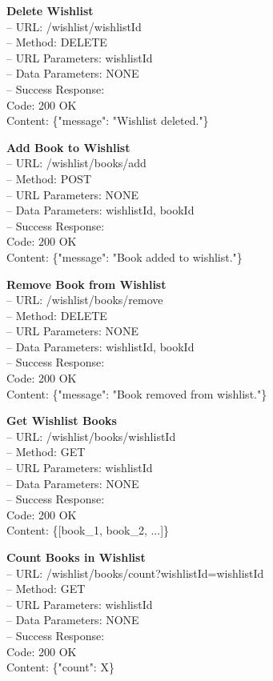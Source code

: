 \textbf{Delete Wishlist} \\
– URL: /wishlist/{wishlistId} \\
– Method: DELETE \\
– URL Parameters: wishlistId \\
– Data Parameters: NONE \\
– Success Response: \\
Code: 200 OK \\
Content: \{"message": "Wishlist deleted."\}

\textbf{Add Book to Wishlist} \\
– URL: /wishlist/books/add \\
– Method: POST \\
– URL Parameters: NONE \\
– Data Parameters: wishlistId, bookId \\
– Success Response: \\
Code: 200 OK \\
Content: \{"message": "Book added to wishlist."\}

\textbf{Remove Book from Wishlist} \\
– URL: /wishlist/books/remove \\
– Method: DELETE \\
– URL Parameters: NONE \\
– Data Parameters: wishlistId, bookId \\
– Success Response: \\
Code: 200 OK \\
Content: \{"message": "Book removed from wishlist."\}

\textbf{Get Wishlist Books} \\
– URL: /wishlist/books/{wishlistId} \\
– Method: GET \\
– URL Parameters: wishlistId \\
– Data Parameters: NONE \\
– Success Response: \\
Code: 200 OK \\
Content: \{[book_1, book_2, ...]\}

\textbf{Count Books in Wishlist} \\
– URL: /wishlist/books/count?wishlistId={wishlistId} \\
– Method: GET \\
– URL Parameters: wishlistId \\
– Data Parameters: NONE \\
– Success Response: \\
Code: 200 OK \\
Content: \{"count": X\}

